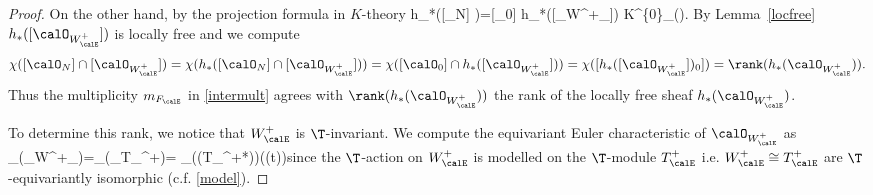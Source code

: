 \begin{proof}
	On the other hand, by the projection formula in $K$-theory \cite[(1)]{piepmeyer-walker} \beq\label{projection}h_*([\calO_{N}] )=[\calO_0] \cap h_*([\calO_{W^+_\calE}]) \in K^{\{0\}}_\circ(\calA).\eeq
{}
	By Lemma~\ref{locfree} $h_*([\calO_{W^+_\calE}])$ is locally free and we  compute $$\chi([\calO_{N}]\cap [\calO_{W^+_\calE}])=\chi(h_*([\calO_{N}]\cap [\calO_{W^+_\calE}]))=\chi([\calO_0]\cap h_*([\calO_{W^+_\calE}]))=\chi([h_*([\calO_{W^+_\calE}])_0])=\rank(h_*(\calO_{W^+_\calE})).$$
	Thus the multiplicity $m_{F_\calE}$ in \eqref{intermult} agrees with $\rank(h_*(\calO_{W^+_\calE}))$ the rank of the locally free sheaf $h_*(\calO_{W^+_\calE})$.

	To determine this rank, we notice that  $W^+_\calE$ is $\T$-invariant. %
	We  compute the equivariant Euler characteristic of $\calO_{W^+_\calE}$  as \beq \label{one}\chi_\T(\calO_{W^+_\calE})=\chi_\T(\calO_{T_\calE^+})= \chi_\T(\Sym(T_\calE^{+*}))\in\Z((t))\eeq since the $\T$-action on $W^+_\calE$ is modelled on the $\T$-module $T_\calE^+$ i.e. $W^+_\calE\cong T_\calE^+$ are $\T$-equivariantly isomorphic (c.f. \eqref{model}).


\end{proof}
